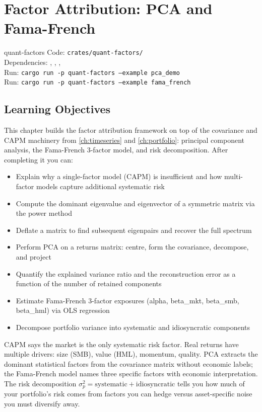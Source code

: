 \chapter{Factor Attribution: PCA and Fama-French}
\label{ch:factors}

\begin{companioncode}{quant-factors}
Code: \texttt{crates/quant-factors/}\\
Dependencies: , , , \\
Run: \texttt{cargo run -p quant-factors --example pca\_demo}\\
Run: \texttt{cargo run -p quant-factors --example fama\_french}
\end{companioncode}

\section{Learning Objectives}

This chapter builds the factor attribution framework on top of the
covariance and CAPM machinery from \cref{ch:timeseries} and
\cref{ch:portfolio}: principal component analysis, the Fama-French
3-factor model, and risk decomposition. After completing it you can:

\begin{itemize}
    \item Explain why a single-factor model (CAPM) is insufficient and how
      multi-factor models capture additional systematic risk
    \item Compute the dominant eigenvalue and eigenvector of a symmetric
      matrix via the power method
    \item Deflate a matrix to find subsequent eigenpairs and recover the
      full spectrum
    \item Perform PCA on a returns matrix: centre, form the covariance,
      decompose, and project
    \item Quantify the explained variance ratio and the reconstruction
      error as a function of the number of retained components
    \item Estimate Fama-French 3-factor exposures (alpha, beta\_mkt,
      beta\_smb, beta\_hml) via OLS regression
    \item Decompose portfolio variance into systematic and idiosyncratic
      components
\end{itemize}

\begin{keyinsight}
CAPM says the market is the only systematic risk factor. Real returns
have multiple drivers: size (SMB), value (HML), momentum, quality. PCA
extracts the dominant statistical factors from the covariance matrix
without economic labels; the Fama-French model names three specific
factors with economic interpretation. The risk decomposition
$\sigma_p^2 = \text{systematic} + \text{idiosyncratic}$ tells you how
much of your portfolio's risk comes from factors you can hedge versus
asset-specific noise you must diversify away.
\end{keyinsight}

